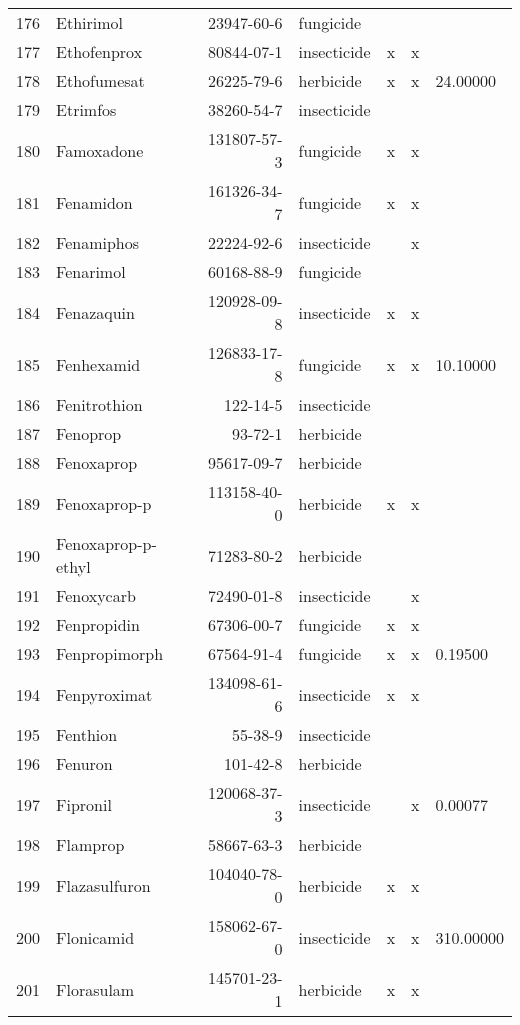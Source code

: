 \begin{longtable}{lp{4cm}rlp{1.3cm}p{1.3cm}p{1.5cm}}
  176 & Ethirimol & 23947-60-6 & fungicide &  &  &  \\ 
  177 & Ethofenprox & 80844-07-1 & insecticide & x & x &  \\ 
  178 & Ethofumesat & 26225-79-6 & herbicide & x & x & 24.00000 \\ 
  179 & Etrimfos & 38260-54-7 & insecticide &  &  &  \\ 
  180 & Famoxadone & 131807-57-3 & fungicide & x & x &  \\ 
  181 & Fenamidon & 161326-34-7 & fungicide & x & x &  \\ 
  182 & Fenamiphos & 22224-92-6 & insecticide &  & x &  \\ 
  183 & Fenarimol & 60168-88-9 & fungicide &  &  &  \\ 
  184 & Fenazaquin & 120928-09-8 & insecticide & x & x &  \\ 
  185 & Fenhexamid & 126833-17-8 & fungicide & x & x & 10.10000 \\ 
  186 & Fenitrothion & 122-14-5 & insecticide &  &  &  \\ 
  187 & Fenoprop & 93-72-1 & herbicide &  &  &  \\ 
  188 & Fenoxaprop & 95617-09-7 & herbicide &  &  &  \\ 
  189 & Fenoxaprop-p & 113158-40-0 & herbicide & x & x &  \\ 
  190 & Fenoxaprop-p-ethyl & 71283-80-2 & herbicide &  &  &  \\ 
  191 & Fenoxycarb & 72490-01-8 & insecticide &  & x &  \\ 
  192 & Fenpropidin & 67306-00-7 & fungicide & x & x &  \\ 
  193 & Fenpropimorph & 67564-91-4 & fungicide & x & x & 0.19500 \\ 
  194 & Fenpyroximat & 134098-61-6 & insecticide & x & x &  \\ 
  195 & Fenthion & 55-38-9 & insecticide &  &  &  \\ 
  196 & Fenuron & 101-42-8 & herbicide &  &  &  \\ 
  197 & Fipronil & 120068-37-3 & insecticide &  & x & 0.00077 \\ 
  198 & Flamprop & 58667-63-3 & herbicide &  &  &  \\ 
  199 & Flazasulfuron & 104040-78-0 & herbicide & x & x &  \\ 
  200 & Flonicamid & 158062-67-0 & insecticide & x & x & 310.00000 \\ 
  201 & Florasulam & 145701-23-1 & herbicide & x & x &  \\ 

\end{longtable}

